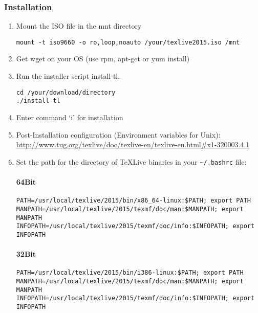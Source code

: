 \documentclass[times,twoside,11pt]{article}
\begin{document}
\subsubsection*{Installation}
\begin{enumerate}
\item	
	Mount the ISO file in the mnt directory
	\begin{lstlisting}[style=shell]
	mount -t iso9660 -o ro,loop,noauto /your/texlive2015.iso /mnt
	\end{lstlisting}

\item
	Get wget on your OS (use rpm, apt-get or yum install)
\item
	Run the installer script install-tl.

\begin{lstlisting}[style=shell]
cd /your/download/directory
./install-tl
\end{lstlisting}

\item
	Enter command `i' for installation

\item
	Post-Installation configuration (Environment variables for Unix): 
	\url{http://www.tug.org/texlive/doc/texlive-en/texlive-en.html\#x1-320003.4.1}
\item	
	Set the path for the directory of \TeX Live binaries in your 
	\verb|~/.bashrc| 
	file:

\paragraph{64Bit}

\begin{verbatim}
PATH=/usr/local/texlive/2015/bin/x86_64-linux:$PATH; export PATH
MANPATH=/usr/local/texlive/2015/texmf/doc/man:$MANPATH; export MANPATH 
INFOPATH=/usr/local/texlive/2015/texmf/doc/info:$INFOPATH; export INFOPATH
\end{verbatim}

\paragraph{32Bit}

\begin{verbatim}
PATH=/usr/local/texlive/2015/bin/i386-linux:$PATH; export PATH 
MANPATH=/usr/local/texlive/2015/texmf/doc/man:$MANPATH; export MANPATH 
INFOPATH=/usr/local/texlive/2015/texmf/doc/info:$INFOPATH; export INFOPATH
\end{verbatim}

\end{enumerate}
\end{document}
